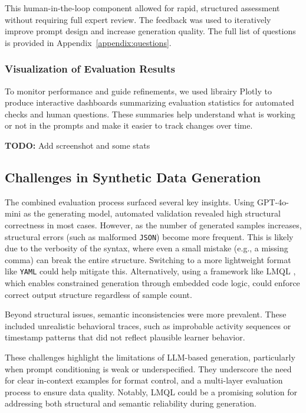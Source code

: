 \documentclass[sigconf]{acmart}
\begin{document}
This human-in-the-loop component allowed for rapid, structured assessment without requiring full expert review. The feedback was used to iteratively improve prompt design and increase generation quality. The full list of questions is provided in Appendix~\ref{appendix:questions}.

\subsubsection{Visualization of Evaluation Results}  
To monitor performance and guide refinements, we used librairy Plotly to produce interactive dashboards summarizing evaluation statistics for automated checks and human questions.
These summaries help understand what is working or not in the prompts and make it easier to track changes over time.

\textbf{TODO:} Add screenshot and some stats

\subsection{Challenges in Synthetic Data Generation}

The combined evaluation process surfaced several key insights. Using GPT-4o-mini as the generating model, automated validation revealed high structural correctness in most cases. However, as the number of generated samples increases, structural errors (such as malformed \texttt{JSON}) become more frequent. This is likely due to the verbosity of the syntax, where even a small mistake (e.g., a missing comma) can break the entire structure. Switching to a more lightweight format like \texttt{YAML} could help mitigate this. Alternatively, using a framework like LMQL \cite{Beurer_Kellner_2023}, which enables constrained generation through embedded code logic, could enforce correct output structure regardless of sample count.

Beyond structural issues, semantic inconsistencies were more prevalent. These included unrealistic behavioral traces, such as improbable activity sequences or timestamp patterns that did not reflect plausible learner behavior.

These challenges highlight the limitations of LLM-based generation, particularly when prompt conditioning is weak or underspecified. They underscore the need for clear in-context examples for format control, and a multi-layer evaluation process to ensure data quality. Notably, LMQL could be a promising solution for addressing both structural and semantic reliability during generation.
\end{document}
